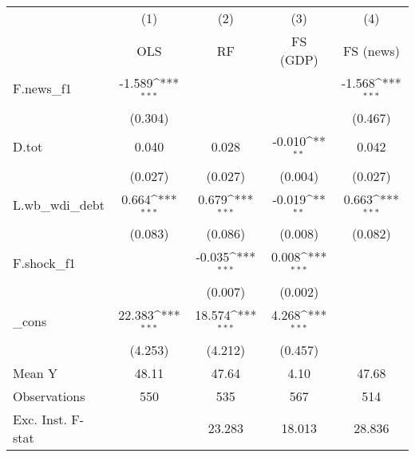 {
\def\sym#1{\ifmmode^{#1}\else\(^{#1}\)\fi}
\begin{tabular}{l*{4}{c}}
\toprule
            &\multicolumn{1}{c}{(1)}&\multicolumn{1}{c}{(2)}&\multicolumn{1}{c}{(3)}&\multicolumn{1}{c}{(4)}\\
            &\multicolumn{1}{c}{OLS}&\multicolumn{1}{c}{RF}&\multicolumn{1}{c}{FS (GDP)}&\multicolumn{1}{c}{FS (news)}\\
\midrule
F.news\_f1   &      -1.589\sym{***}&                     &                     &      -1.568\sym{***}\\
            &     (0.304)         &                     &                     &     (0.467)         \\
\addlinespace
D.tot       &       0.040         &       0.028         &      -0.010\sym{**} &       0.042         \\
            &     (0.027)         &     (0.027)         &     (0.004)         &     (0.027)         \\
\addlinespace
L.wb\_wdi\_debt&       0.664\sym{***}&       0.679\sym{***}&      -0.019\sym{**} &       0.663\sym{***}\\
            &     (0.083)         &     (0.086)         &     (0.008)         &     (0.082)         \\
\addlinespace
F.shock\_f1  &                     &      -0.035\sym{***}&       0.008\sym{***}&                     \\
            &                     &     (0.007)         &     (0.002)         &                     \\
\addlinespace
\_cons      &      22.383\sym{***}&      18.574\sym{***}&       4.268\sym{***}&                     \\
            &     (4.253)         &     (4.212)         &     (0.457)         &                     \\
\midrule
Mean Y      &       48.11         &       47.64         &        4.10         &       47.68         \\
Observations&         550         &         535         &         567         &         514         \\
Exc. Inst. F-stat&                     &      23.283         &      18.013         &      28.836         \\
\bottomrule
\end{tabular}
}
